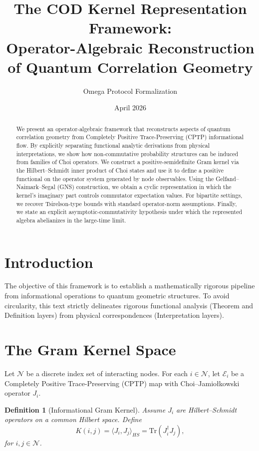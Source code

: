 \documentclass[11pt, a4paper]{article}
\title{The COD Kernel Representation Framework: \\ Operator-Algebraic Reconstruction of Quantum Correlation Geometry}
\author{Omega Protocol Formalization}
\date{April 2026}
\newtheorem{definition}{Definition}
\begin{document}
\maketitle

\begin{abstract}
We present an operator-algebraic framework that reconstructs aspects of quantum correlation geometry from Completely Positive Trace-Preserving (CPTP) informational flow. By explicitly separating functional analytic derivations from physical interpretations, we show how non-commutative probability structures can be induced from families of Choi operators. We construct a positive-semidefinite Gram kernel via the Hilbert--Schmidt inner product of Choi states and use it to define a positive functional on the operator system generated by node observables. Using the Gelfand--Naimark--Segal (GNS) construction, we obtain a cyclic representation in which the kernel's imaginary part controls commutator expectation values. For bipartite settings, we recover Tsirelson-type bounds with standard operator-norm assumptions. Finally, we state an explicit asymptotic-commutativity hypothesis under which the represented algebra abelianizes in the large-time limit.
\end{abstract}

\section{Introduction}

The objective of this framework is to establish a mathematically rigorous pipeline from informational operations to quantum geometric structures. To avoid circularity, this text strictly delineates rigorous functional analysis (Theorem and Definition layers) from physical correspondences (Interpretation layers).

\section{The Gram Kernel Space}

Let $\mathcal{N}$ be a discrete index set of interacting nodes. For each $i \in \mathcal{N}$, let $\mathcal{E}_i$ be a Completely Positive Trace-Preserving (CPTP) map with Choi--Jamio\l{}kowski operator $J_i$.

\begin{definition}[Informational Gram Kernel]
Assume $J_i$ are Hilbert--Schmidt operators on a common Hilbert space. Define
\begin{equation}
    K(i,j) = \langle J_i, J_j \rangle_{HS} = \mathrm{Tr}(J_i^\dagger J_j),
\end{equation}
for $i,j \in \mathcal{N}$.
\end{definition}
\end{document}

